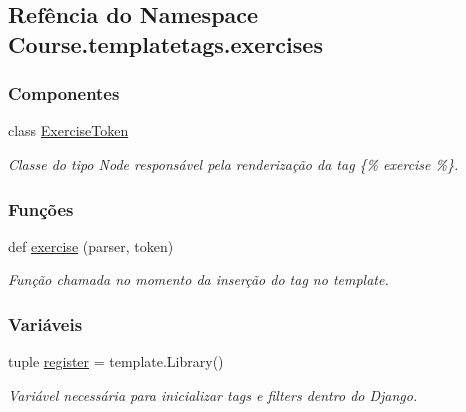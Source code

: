 \hypertarget{namespaceCourse_1_1templatetags_1_1exercises}{}\subsection{Refência do Namespace Course.\+templatetags.\+exercises}
\label{namespaceCourse_1_1templatetags_1_1exercises}
\subsubsection*{Componentes}
\begin{DoxyCompactItemize}
\item 
class \hyperlink{classCourse_1_1templatetags_1_1exercises_1_1ExerciseToken}{Exercise\+Token}
\begin{DoxyCompactList}\small\item\em Classe do tipo Node responsável pela renderização da tag \{\% exercise \%\}. \end{DoxyCompactList}\end{DoxyCompactItemize}
\subsubsection*{Funções}
\begin{DoxyCompactItemize}
\item 
def \hyperlink{namespaceCourse_1_1templatetags_1_1exercises_a8c8aa0687de6cfe821c8acaecafba711}{exercise} (parser, token)
\begin{DoxyCompactList}\small\item\em Função chamada no momento da inserção do tag no template. \end{DoxyCompactList}\end{DoxyCompactItemize}
\subsubsection*{Variáveis}
\begin{DoxyCompactItemize}
\item 
tuple \hyperlink{namespaceCourse_1_1templatetags_1_1exercises_a69bf3f5149bab102a018136707f13e10}{register} = template.\+Library()
\begin{DoxyCompactList}\small\item\em Variável necessária para inicializar tags e filters dentro do Django. \end{DoxyCompactList}\end{DoxyCompactItemize}



